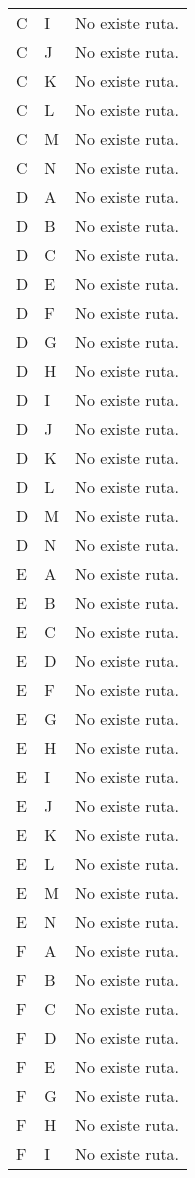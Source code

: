 \documentclass{article}
\begin{document}
\begin{longtable}{llp{}}
C & I & No existe ruta.\\
C & J & No existe ruta.\\
C & K & No existe ruta.\\
C & L & No existe ruta.\\
C & M & No existe ruta.\\
C & N & No existe ruta.\\
D & A & No existe ruta.\\
D & B & No existe ruta.\\
D & C & No existe ruta.\\
D & E & No existe ruta.\\
D & F & No existe ruta.\\
D & G & No existe ruta.\\
D & H & No existe ruta.\\
D & I & No existe ruta.\\
D & J & No existe ruta.\\
D & K & No existe ruta.\\
D & L & No existe ruta.\\
D & M & No existe ruta.\\
D & N & No existe ruta.\\
E & A & No existe ruta.\\
E & B & No existe ruta.\\
E & C & No existe ruta.\\
E & D & No existe ruta.\\
E & F & No existe ruta.\\
E & G & No existe ruta.\\
E & H & No existe ruta.\\
E & I & No existe ruta.\\
E & J & No existe ruta.\\
E & K & No existe ruta.\\
E & L & No existe ruta.\\
E & M & No existe ruta.\\
E & N & No existe ruta.\\
F & A & No existe ruta.\\
F & B & No existe ruta.\\
F & C & No existe ruta.\\
F & D & No existe ruta.\\
F & E & No existe ruta.\\
F & G & No existe ruta.\\
F & H & No existe ruta.\\
F & I & No existe ruta.\\

\end{longtable}
\end{document}
